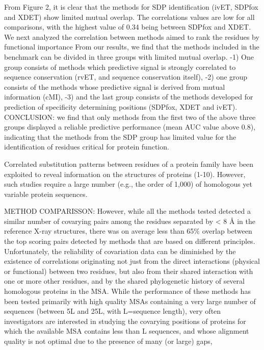 	From Figure 2, it is clear that the methods for SDP identification (ivET, SDPfox and XDET) show limited mutual overlap. The correlations values are low for all comparisons, with the highest value of 0.34 being between SDPfox and XDET. \cite{teppa2012disentangling}
	 We next analyzed the correlation between methods aimed to rank the residues by functional importance \cite{teppa2012disentangling}
	From our results, we find that the methods included in the benchmark can be divided in three groups with limited mutual overlap.  \cite{teppa2012disentangling}
		-1) One group consists of methods which predictive signal is strongly correlated to sequence conservation (rvET, and sequence conservation itself),  \cite{teppa2012disentangling}
		-2) one group consists of the methods whose predictive signal is derived from mutual information (cMI),  \cite{teppa2012disentangling}
		-3) and the last group consists of the methods developed for prediction of specificity determining positions (SDPfox, XDET and ivET). \cite{teppa2012disentangling}
	CONCLUSION:  we find that only methods from the first two of the above three groups displayed a reliable predictive performance (mean AUC value above 0.8), indicating that the methods from the SDP group has limited value for the identification of residues critical for protein function. \cite{teppa2012disentangling}

Correlated substitution patterns between residues of a protein family have been exploited to reveal information on the structures of proteins (1-10).  \cite{morcos2011direct}
However, such studies require a large number (e.g., the order of 1,000) of homologous yet variable protein sequences.  \cite{morcos2011direct}


METHOD COMPARISSON: However, while all the methods tested detected a similar number of covarying pairs among the residues separated by < 8 Å in the reference X-ray structures, there was on average less than 65\% overlap between the top scoring pairs detected by methods that are based on different principles. \cite{clark2014multidimensional}
Unfortunately, the reliability of covariation data can be diminished by the existence of correlations originating not just from the direct interactions (physical or functional) between two residues, but also from their shared interaction with one or more other residues, and by the shared phylogenetic history of several homologous proteins in the MSA.  \cite{clark2014multidimensional}
While the performance of these methods has been tested primarily with high quality MSAs containing a very large number of sequences (between 5L and 25L, with L=sequence length), very often investigators are interested in studying the covarying positions of proteins for which the available MSA contains less than L sequences, and whose alignment quality is not optimal due to the presence of many (or large) gaps, \cite{clark2014multidimensional}
